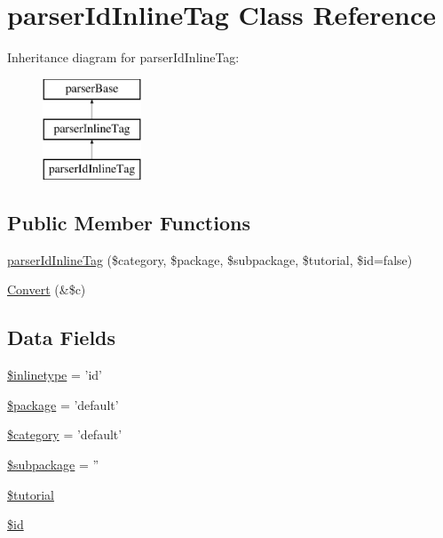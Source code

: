 \hypertarget{classparser_id_inline_tag}{\section{parser\-Id\-Inline\-Tag \-Class \-Reference}
\label{classparser_id_inline_tag}
}
\-Inheritance diagram for parser\-Id\-Inline\-Tag\-:\begin{figure}[H]
\begin{center}
\leavevmode
\includegraphics[height=3.000000cm]{classparser_id_inline_tag}
\end{center}
\end{figure}
\subsection*{\-Public \-Member \-Functions}
\begin{DoxyCompactItemize}
\item 
\hyperlink{classparser_id_inline_tag_ae648f493ea20f830f138babf21ef7272}{parser\-Id\-Inline\-Tag} (\$category, \$package, \$subpackage, \$tutorial, \$id=false)
\item 
\hyperlink{classparser_id_inline_tag_ad6c06bea9d11cc1c362b592306cfa707}{\-Convert} (\&\$c)
\end{DoxyCompactItemize}
\subsection*{\-Data \-Fields}
\begin{DoxyCompactItemize}
\item 
\hyperlink{classparser_id_inline_tag_a7583c1b3912b7afa3f038eb353a6ad97}{\$inlinetype} = 'id'
\item 
\hyperlink{classparser_id_inline_tag_a365395516cc195292e97e09bc0d165ae}{\$package} = 'default'
\item 
\hyperlink{classparser_id_inline_tag_a18b2a8d133fa7733bf34abcc6ca2ef5b}{\$category} = 'default'
\item 
\hyperlink{classparser_id_inline_tag_ac601dc8dc2a086b6381128cc9c7a3fc5}{\$subpackage} = ''
\item 
\hyperlink{classparser_id_inline_tag_a78498c66c97cfd4c420a7f2908b65f24}{\$tutorial}
\item 
\hyperlink{classparser_id_inline_tag_ae97941710d863131c700f069b109991e}{\$id}
\end{DoxyCompactItemize}



